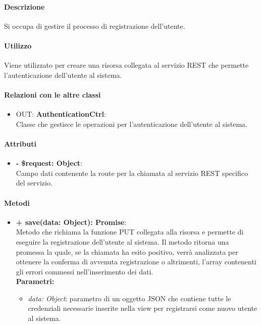 		\paragraph{Descrizione}
		Si occupa di gestire il processo di registrazione dell'utente.
		
		\paragraph{Utilizzo}
		Viene utilizzato per creare una risorsa collegata al servizio REST che permette l'autenticazione dell'utente al sistema.
		
		\paragraph{Relazioni con le altre classi}
		\begin{itemize}
			\item OUT: \textbf{AuthenticationCtrl}:\\
			Classe che gestisce le operazioni per l'autenticazione dell'utente al sistema.
		\end{itemize}
		
		\paragraph{Attributi}
		\begin{itemize}
			\item \textbf{- \$request: Object}:\\
			Campo dati contenente la route per la chiamata al servizio REST specifico del servizio.
		\end{itemize}	
		
		\paragraph{Metodi}
		\begin{itemize}
			\item \textbf{+ save(data: Object): Promise}:\\
			Metodo che richiama la funzione PUT collegata alla risorsa e permette di eseguire la registrazione dell'utente al sistema. Il metodo ritorna una promessa la quale, se la chiamata ha esito positivo, verrà analizzata per ottenere la conferma di avvenuta registrazione o altrimenti, l'array contenenti gli errori commessi nell'inserimento dei dati.\\
			\textbf{Parametri:}\\
			\begin{itemize}
				\item \textit{data: Object}: parametro di un oggetto JSON che contiene tutte le credenziali necessarie inserite nella view per registrarsi come nuovo utente al sistema.
			\end{itemize}
		\end{itemize}
\newpage
		
